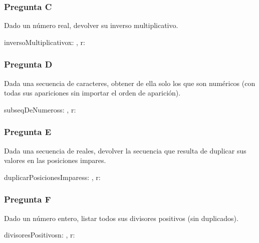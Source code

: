 \subsubsection{Pregunta C}

Dado un número real, devolver su inverso multiplicativo.

\begin{proc}{inversoMultiplicativo}{\In x: \float, \Out r: \float}{}
\end{proc}

\subsubsection{Pregunta D}

Dada una secuencia de caracteres, obtener de ella solo los que son numéricos (con todas sus apariciones sin importar el orden de aparición).

\begin{proc}{subseqDeNumeros}{\In s: , \Out r: }{}
\end{proc}

\subsubsection{Pregunta E}

Dada una secuencia de reales, devolver la secuencia que resulta de duplicar sus valores en las posiciones impares.

\begin{proc}{duplicarPosicionesImpares}{\In s: \TLista{\float}, \Out r: \TLista{\float}}{}
\end{proc}

\subsubsection{Pregunta F}

Dado un número entero, listar todos sus divisores positivos (sin duplicados).

\begin{proc}{divisoresPositivos}{\In n: \ent, \Out r: \TLista{\ent}}{}
\end{proc}

